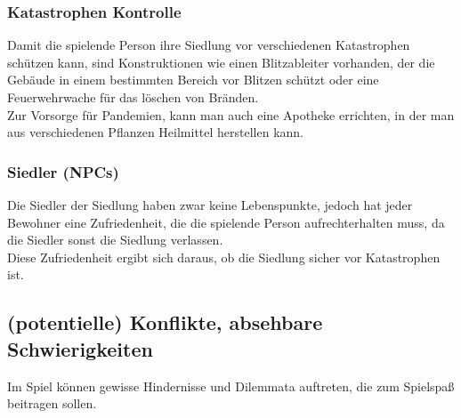 \documentclass[paper=A4,pagesize=auto,12pt,headinclude=true,footinclude=true,BCOR=0mm,DIV=calc]{scrartcl}
\newcommand{\sectionspace}{
	\vspace{0.5cm}
}
\begin{document}
\subsubsection{Katastrophen Kontrolle}
Damit die spielende Person ihre Siedlung vor verschiedenen Katastrophen schützen kann, sind Konstruktionen wie einen Blitzableiter vorhanden, der die Gebäude in einem bestimmten Bereich vor Blitzen schützt oder eine Feuerwehrwache für das löschen von Bränden.\\
Zur Vorsorge für Pandemien, kann man auch eine Apotheke errichten, in der man aus verschiedenen Pflanzen Heilmittel herstellen kann. 

\subsubsection{Siedler (NPCs)}
Die Siedler der Siedlung haben zwar keine Lebenspunkte, jedoch hat jeder Bewohner eine Zufriedenheit, die die spielende Person aufrechterhalten muss, da die Siedler sonst die Siedlung verlassen.\\
Diese Zufriedenheit ergibt sich daraus, ob die Siedlung sicher vor Katastrophen ist.

\sectionspace
\subsection{(potentielle) Konflikte, absehbare Schwierigkeiten}\label{sec:Konflikte}

Im Spiel können gewisse Hindernisse und Dilemmata auftreten, die zum Spielspaß beitragen sollen.\\
\end{document}
